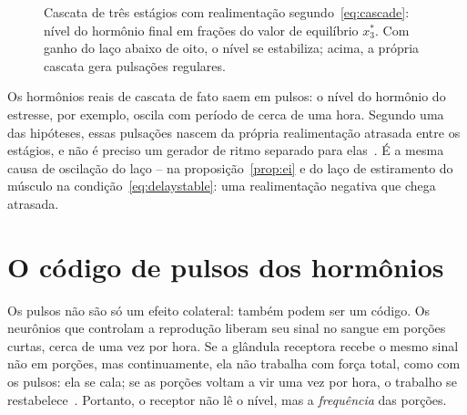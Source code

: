 \begin{figure}[t]
\centering
{}
\caption{Cascata de três estágios com realimentação segundo~\eqref{eq:cascade}: nível do hormônio final em frações do valor de equilíbrio $x_3^*$. Com ganho do laço abaixo de oito, o nível se estabiliza; acima, a própria cascata gera pulsações regulares.}
\label{fig:cascade}
\end{figure}

Os hormônios reais de cascata de fato saem em pulsos: o nível do hormônio do estresse, por exemplo, oscila com período de cerca de uma hora. Segundo uma das hipóteses, essas pulsações nascem da própria realimentação atrasada entre os estágios, e não é preciso um gerador de ritmo separado para elas~\cite{Walker2010}. É a mesma causa de oscilação do laço -- na proposição~\ref{prop:ei} e do laço de estiramento do músculo na condição~\eqref{eq:delaystable}: uma realimentação negativa que chega atrasada.

\section{O código de pulsos dos hormônios}

Os pulsos não são só um efeito colateral: também podem ser um código. Os neurônios que controlam a reprodução liberam seu sinal no sangue em porções curtas, cerca de uma vez por hora. Se a glândula receptora recebe o mesmo sinal não em porções, mas continuamente, ela não trabalha com força total, como com os pulsos: ela se cala; se as porções voltam a vir uma vez por hora, o trabalho se restabelece~\cite{Belchetz1978}. Portanto, o receptor não lê o nível, mas a \emph{frequência} das porções.

